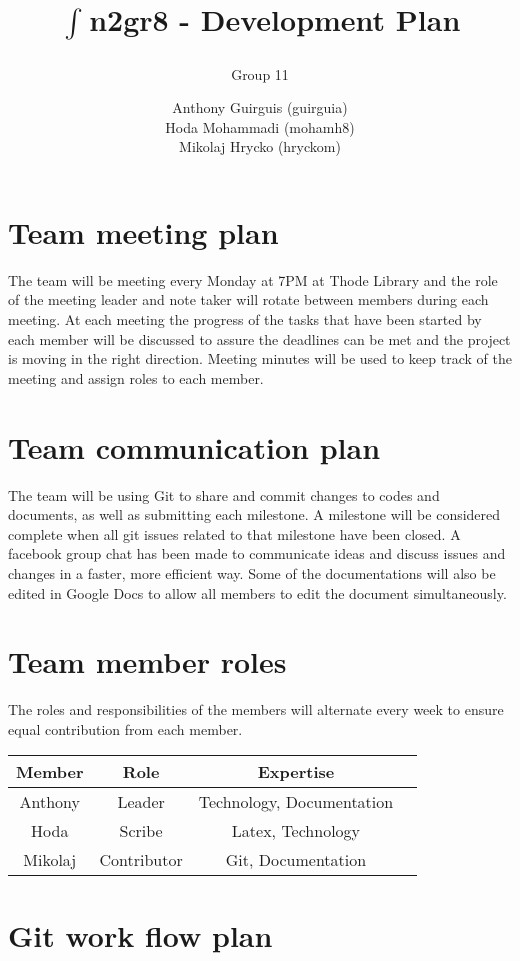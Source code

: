 \documentclass[12pt,fleqn]{article}
\title{$\int_{}^{}$n2gr8 - Development Plan}
\subtitle{Group 11}
\author{Anthony Guirguis (guirguia) \\ Hoda Mohammadi (mohamh8) \\ Mikolaj Hrycko (hryckom)}
\begin{document}
\maketitle
\newpage

\section *{Team meeting plan}        
The team will be meeting every Monday at 7PM at Thode Library and the role of the meeting leader and note taker will rotate between members during each meeting. At each meeting the progress of the tasks that have been started by each member will be discussed to assure the deadlines can be met and the project is moving in the right direction. Meeting minutes will be used to keep track of the meeting and assign roles to each member. 

\section *{Team communication plan}
The team will be using Git to share and commit changes to codes and documents, as well as submitting each milestone. A milestone will be considered complete when all git issues related to that milestone have been closed. A facebook group chat has been made to communicate ideas and discuss issues and changes in a faster, more efficient way. Some of the documentations will also be edited in Google Docs to allow all members to edit the document simultaneously.  

\section *{Team member roles}    
The roles and responsibilities of the members will alternate every week to ensure equal contribution from each member. 

\begin{center}
\begin{tabular}{ |c|c|c|c| } 
\hline
Member & Role & Expertise \\
\hline
Anthony & Leader & Technology, Documentation \\ 
Hoda & Scribe & Latex, Technology\\ 
Mikolaj & Contributor & Git, Documentation \\ 
\hline
\end{tabular}
\end{center}


\section *{Git work flow plan}
\end{document}
